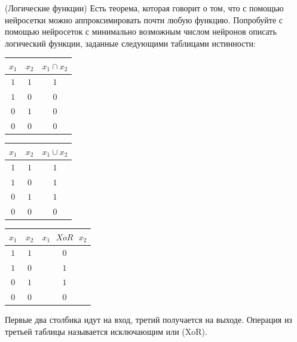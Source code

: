 \documentclass[12pt, a4paper, oneside]{article}
\theoremstyle{plain} %
\theoremstyle{definition}
\begin{document}
\begin{problem}{(Логические функции)}
Есть теорема, которая говорит о том, что с помощью нейросетки можно аппроксимировать почти любую функцию. Попробуйте с помощью нейросеток с минимально возможным числом нейронов описать логический функции, заданные следующими таблицами истинности:

\begin{center}
\begin{minipage}{0.3\linewidth} 
\begin{tabular}{c|c|c}
	$x_1$ & $x_2$ & $x_1 \cap x_2$ \\
	\hline 
	$1$ & $1$ & $1$ \\
	\hline 
	$1$ & $0$ & $0$ \\
	\hline 
	$0$ & $1$ & $0$ \\
	\hline 
	$0$ & $0$ & $0$ \\
\end{tabular}
\end{minipage}
\hfill
\begin{minipage}{0.3\linewidth}
		\begin{tabular}{c|c|c}
		$x_1$ & $x_2$ & $x_1 \cup x_2$ \\
		\hline 
		$1$ & $1$ & $1$ \\
		\hline 
		$1$ & $0$ & $1$ \\
		\hline 
		$0$ & $1$ & $1$ \\
		\hline 
		$0$ & $0$ & $0$ \\
	\end{tabular}
\end{minipage}
\hfill
\begin{minipage}{0.3\linewidth}
		\begin{tabular}{c|c|c}
		$x_1$ & $x_2$ & $x_1 \mbox{ } XoR \mbox{ } x_2$ \\
		\hline 
		$1$ & $1$ & $0$ \\
		\hline 
		$1$ & $0$ & $1$ \\
		\hline 
		$0$ & $1$ & $1$ \\
		\hline 
		$0$ & $0$ & $0$ \\
	\end{tabular}
\end{minipage}
\end{center}

Первые два столбика идут на вход, третий получается на выходе.  Операция из третьей таблицы называется исключающим или (XoR).
\end{problem}
\end{document}

